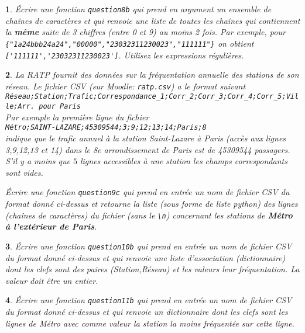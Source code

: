 \documentclass[10pt]{article}
\newtheorem{exi}{}
\newenvironment{exo}{\begin{exi}\em}{\end{exi}}
\begin{document}
\begin{exo}
    Écrire une fonction {\tt question8b} qui prend en argument un ensemble
de chaînes de caractères et qui renvoie une liste de toutes les chaînes
qui contiennent la {\bf même} suite de 3
chiffres (entre 0 et 9) au moins 2 fois.
Par exemple, pour \verb+{"1a24bbb24a24","00000","23032311230023","111111"}+
on obtient \verb+['111111','23032311230023']+.
Utilisez les expressions régulières.
\end{exo}
\begin{exo}
    La RATP fournit des données sur la fréquentation annuelle des stations de son réseau. Le fichier CSV (sur Moodle: \verb+ratp.csv+) a le format suivant\\
\verb+Réseau;Station;Trafic;Correspondance_1;Corr_2;Corr_3;Corr_4;Corr_5;Ville;Arr. pour Paris+\\
Par exemple la première ligne du fichier\\
\verb+Métro;SAINT-LAZARE;45309544;3;9;12;13;14;Paris;8+\\
indique que le trafic annuel à la station Saint-Lazare à Paris (accès aux lignes 3,9,12,13 et 14) dans le 8e arrondissement de Paris est de 45309544 passagers. S'il y a moins que $5$ lignes accessibles à une station les champs correspondants sont vides. 

Écrire une fonction {\tt question9c} qui prend en entrée un nom de fichier CSV
du format donné ci-dessus
et retourne la liste (sous forme de liste python) des lignes (chaînes
de caractères) du fichier (sans le \verb+\n+)
concernant les stations de {\bf Métro à l'extérieur de Paris}.
\end{exo}
\begin{exo}
    Écrire une fonction {\tt question10b} qui prend en entrée un nom de fichier CSV
du format donné ci-dessus
et qui renvoie une liste d'association (dictionnaire) dont les clefs sont
des paires (Station,Réseau) et les valeurs leur fréquentation.
La valeur doit être un entier.
\end{exo}
\begin{exo}
    Écrire une fonction {\tt question11b} qui prend en entrée un nom de fichier CSV
du format donné ci-dessus et qui renvoie un dictionnaire dont les clefs sont
les lignes de Métro
avec comme valeur la station la moins fréquentée sur cette ligne.
\end{exo}
\vspace*{-2ex}
\vspace*{-2ex}
\vspace*{-2ex}
\vspace*{-2ex}
\end{document}
